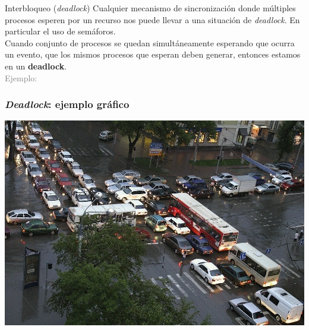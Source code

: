 \documentclass[aspectratio=169]{beamer}
\begin{document}
\begin{frame}[t]{Interbloqueo (\textit{deadlock})}
    Cualquier mecanismo de sincronización donde múltiples procesos esperen por un recurso nos puede llevar a una situación de \emph{deadlock}.
    En particular el uso de semáforos.\\
    \bigskip
    Cuando conjunto de procesos se quedan simultáneamente esperando que ocurra un evento, que los mismos procesos que esperan deben generar, entonces estamos en un \textcolor{naranjauca}{\textbf{deadlock}}.\\
    \bigskip
    \textcolor{gray}{Ejemplo:\\}
    \bigskip    
\end{frame}

\begin{frame}
    \frametitle{\textit{Deadlock}: ejemplo gráfico}
    \begin{center}
        \includegraphics[scale=0.3]{img/deadlock_traffic.jpeg}
    \end{center}
\end{frame}
\end{document}
